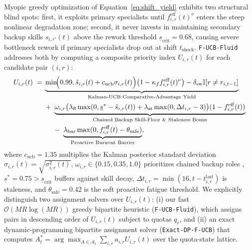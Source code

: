 \documentclass[11pt]{article}
\begin{document}
Myopic greedy optimization of Equation~\eqref{eq:shift_yield} exhibits two structural blind spots: first, it exploits primary specialists until $f_{i,r}^{\mathrm{eff}}(t)^{\nu}$ enters the steep nonlinear degradation zone; second, it never invests in maintaining secondary backup skills $s_{i,r'}(t)$ above the rework threshold $\underline{s}_{\mathrm{crit}} = 0.68$, causing severe bottleneck rework if primary specialists drop out at shift $t_{\mathrm{shock}}$. \texttt{F-UCB-Fluid} addresses both by computing a composite priority index $U_{i,r}(t)$ for each candidate pair $(i, r)$:
\begin{equation}
\begin{aligned}
U_{i,r}(t) \;=\;& \underbrace{\min\!\Bigl(0.99, \hat{s}_{i,r}(t) + c_{\mathrm{ucb}}\sigma_{i,r}(t)\Bigr)\bigl(1 - \kappa_f f_{i,r}^{\mathrm{eff}}(t)^{\nu}\bigr) - \delta_{\mathrm{sw}}\mathbb{I}[r \neq r_{i,t-1}]}_{\text{Kalman-UCB Comparative-Advantage Yield}} \\
&+\; \underbrace{\omega_{i,r}\bigl(\lambda_{\mathrm{fl}}\max(0, \underline{s}^* - \hat{s}_{i,r}(t)) + \lambda_{\mathrm{st}}\max(0, \Delta t_{i,r} - 3)\bigr)(1 - f_{i,r}^{\mathrm{eff}}(t))}_{\text{Chained Backup Skill-Floor \& Staleness Bonus}} \\
&\quad \;-\; \underbrace{\lambda_{\mathrm{bar}}\max(0, f_{i,r}^{\mathrm{eff}}(t) - \theta_{\mathrm{safe}})}_{\text{Proactive Burnout Barrier}},
\end{aligned}
\label{eq:f_ucb_obj}
\end{equation}
where $c_{\mathrm{ucb}} = 1.35$ multiplies the Kalman posterior standard deviation $\sigma_{i,r}(t) = \sqrt{\sigma_{i,r}^2(t)}$, $\omega_{i,r} \allowbreak \in \{0.15,\allowbreak 0.35,\allowbreak 1.0\}$ prioritizes chained backup roles \citep{hopp2004chaining}, $\underline{s}^* = 0.75 > \underline{s}_{\mathrm{crit}}$ buffers against skill decay, $\Delta t_{i,r} = \min(16,\allowbreak t - t^{\mathrm{last}}_{i,r})$ is staleness, and $\theta_{\mathrm{safe}} = 0.42$ is the soft proactive fatigue threshold. We explicitly distinguish two assignment solvers over $U_{i,r}(t)$: (i) our fast $\mathcal{O}(MR \log(MR))$ greedy bipartite heuristic (\texttt{F-UCB-Fluid}), which assigns pairs in descending order of $U_{i,r}(t)$ subject to quotas $q_r$, and (ii) an exact dynamic-programming bipartite assignment solver (\texttt{Exact-DP-F-UCB}) that computes $A_t^* = \arg\max_{A \in \mathcal{A}_t} \sum_{i,r} a_{i,r} U_{i,r}(t)$ over the quota-state lattice.

\end{document}
